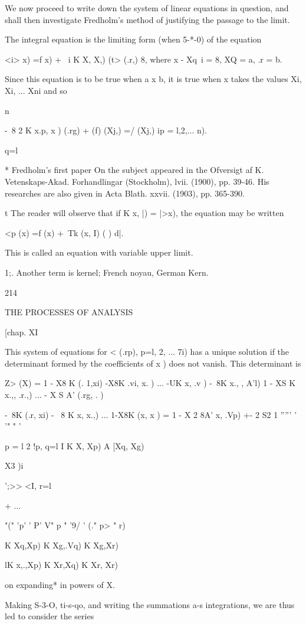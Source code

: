 We now proceed to write down the system of linear equations in
question, and shall then investigate Fredholm's method of justifying
the passage to the limit.

The integral equation is the limiting form (when 5-*-0) of the
equation

<i> x) =f x) + \ i K X, X,) (t> (.r,) 8, where x - Xq\ i = 8, XQ = a,
.r = b.

Since this equation is to be true when a x b, it is true when x takes
the values Xi, Xi, ... Xni and so

n

-\ 8 2 K x.p, x ) (.rg) + (f) (Xj,) =/ (Xj,) ip = l,2,... n).

q=l

* Fredholm's first paper On the subject appeared in the Ofversigt af
K. Vetenskaps-Akad. Forhandlingar (Stockholm), lvii. (1900), pp.
39-46. His researches are also given in Acta Blath. xxvii. (1903), pp.
365-390.

t The reader will observe that if K x, |) = |>x), the equation may be
written

<p (x) =f (x) +\ Tk (x, I) ( ) d|.

This is called an equation with variable upper limit.

1;. Another term is kernel; French noyau, German Kern.

214

THE PROCESSES OF ANALYSIS

[chap. XI

This system of equations for < (.rp), p=l, 2, ... 7i) has a unique
solution if the determinant formed by the coefficients of x ) does not
vanish. This determinant is

Z> (X) = 1 - X8 K (. 1,xi) -X8K .vi, x. ) ... -UK x, .v ) -\ 8K x.,
, A'l) 1 - XS K x.,, .r.,) ... - X S A' (.rg, . )

-\ 8K (.r, xi) - \ 8 K x, x.,) ... 1-X8K (x, x ) = 1 - X 2 8A' x,
.Vp) +- 2 S2 1 ''''' '  '" " '

p = l 2 !p, q=l I K X, Xp) A [Xq, Xg)

X3 )i

';>> <I, r=l

+ ...

 "(" 'p' ' P' V" p " '9/ ' (." p> " r)

K Xq,Xp) K Xg,.Vq) K Xg,Xr)

lK x,.,Xp) K Xr,Xq) K Xr, Xr)

on expanding* in powers of X.

Making S-3-O, ti-s-qo, and writing the summations a-s integrations, we
are thus led to consider the series

